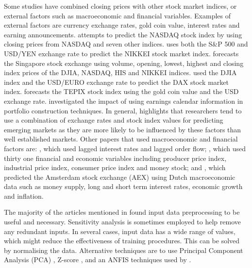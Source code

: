 \documentclass{UoYCSproject}
\begin{document}
Some studies have combined closing prices with other stock market indices, or external factors such as macroeconomic and financial variables. Examples of external factors are currency exchange rates, gold coin value, interest rates and earning announcements. \cite{ajith2003hybrid} attempts to predict the NASDAQ stock index by using closing prices from NASDAQ and seven other indices. \cite{huang2005forecasting} uses both the S\&P 500 and USD/YEN exchange rate to predict the NIKKEI stock market index. \cite{phua2001neural} forecasts the Singapore stock exchange using volume, opening, lowest, highest and closing index prices of the DJIA, NASDAQ, HIS and NIKKEI indices. \cite{siekmann1999information} used the DJIA index and the USD/EURO exchange rate to predict the DAX stock market index. \cite{tabrizi2000stock} forecasts the TEPIX stock index using the gold coin value and the USD exchange rate. \cite{levodeanschi2016} investigated the impact of using earnings calendar information in portfolio construction techniques. In general, \cite{atsalakis2009surveying} highlights that researchers tend to use a combination of exchange rates and stock index values for predicting emerging markets as they are more likely to be influenced by these factors than well established markets. Other papers that used macroeconomic and financial factors are: \cite{gradojevic2002neuro}, which used lagged interest rates and lagged order flow; \cite{thawornwong2004adaptive}, which used thirty one financial and economic variables including producer price index, industrial price index, consumer price index and money stock; and \cite{setnes1999fuzzy}, which predicted the Amsterdam stock exchange (AEX) using Dutch macroeconomic data such as money supply, long and short term interest rates, economic growth and inflation.

The majority of the articles mentioned in \cite{atsalakis2009surveying} found input data preprocessing to be useful and necessary. Sensitivity analysis is sometimes employed to help remove any redundant inputs. In several cases, input data has a wide range of values, which might reduce the effectiveness of training procedures. This can be solved by normalising the data. Alternative techniques are to use Principal Component Analysis (PCA) \cite{ajith2003hybrid}, Z-score \cite{leigh2002analysis}, and an ANFIS techniques used by \cite{atsalakis2006neuro}. 
\end{document}
